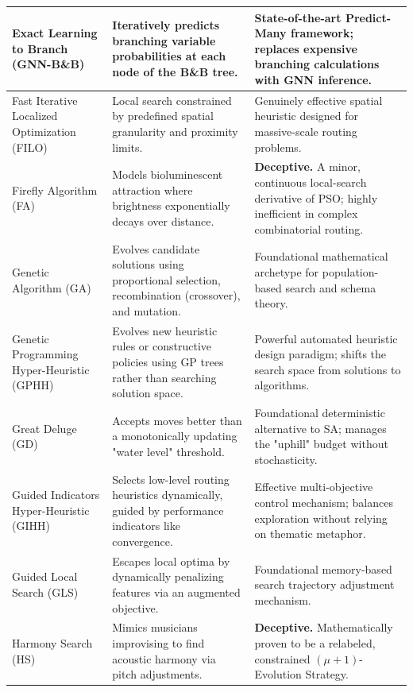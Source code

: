 \begin{center}
\begin{longtable}{
  >{\raggedright\arraybackslash}p{}
  >{\raggedright\arraybackslash}p{}
  >{\raggedright\arraybackslash}p{}
}
Exact Learning to Branch (GNN-B\&B) & Iteratively predicts branching variable probabilities at each node of the B\&B tree. & State-of-the-art Predict-Many framework; replaces expensive branching calculations with GNN inference. \\ \midrule

Fast Iterative Localized Optimization (FILO) & Local search constrained by predefined spatial granularity and proximity limits. & Genuinely effective spatial heuristic designed for massive-scale routing problems. \\ \midrule

Firefly Algorithm (FA) & Models bioluminescent attraction where brightness exponentially decays over distance. & \textbf{Deceptive.} A minor, continuous local-search derivative of PSO; highly inefficient in complex combinatorial routing. \\ \midrule

Genetic Algorithm (GA) & Evolves candidate solutions using proportional selection, recombination (crossover), and mutation. & Foundational mathematical archetype for population-based search and schema theory. \\ \midrule

Genetic Programming Hyper-Heuristic (GPHH) & Evolves new heuristic rules or constructive policies using GP trees rather than searching solution space. & Powerful automated heuristic design paradigm; shifts the search space from solutions to algorithms. \\ \midrule

Great Deluge (GD) & Accepts moves better than a monotonically updating "water level" threshold. & Foundational deterministic alternative to SA; manages the "uphill" budget without stochasticity. \\ \midrule

Guided Indicators Hyper-Heuristic (GIHH) & Selects low-level routing heuristics dynamically, guided by performance indicators like convergence. & Effective multi-objective control mechanism; balances exploration without relying on thematic metaphor. \\ \midrule

Guided Local Search (GLS) & Escapes local optima by dynamically penalizing features via an augmented objective. & Foundational memory-based search trajectory adjustment mechanism. \\ \midrule

Harmony Search (HS) & Mimics musicians improvising to find acoustic harmony via pitch adjustments. & \textbf{Deceptive.} Mathematically proven to be a relabeled, constrained $(\mu + 1)$-Evolution Strategy. \\ \midrule


\end{longtable}
\end{center}
